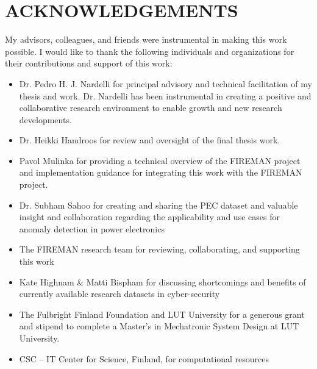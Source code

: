 \section*{\MakeUppercase{Acknowledgements}}
\thispagestyle{empty}
{}%

My advisors, colleagues, and friends were instrumental in making this work possible. I would like to thank the following individuals and organizations for their contributions and support of this work:

\begin{itemize}
    \item Dr. Pedro H. J. Nardelli for principal advisory and technical facilitation of my thesis and work. Dr. Nardelli has been instrumental in creating a positive and collaborative research environment to enable growth and new research developments.
    \item Dr. Heikki Handroos for review and oversight of the final thesis work.
    \item Pavol Mulinka for providing a technical overview of the FIREMAN project and implementation guidance for integrating this work with the FIREMAN project.
    \item Dr. Subham Sahoo for creating and sharing the PEC dataset and valuable insight and collaboration regarding the applicability and use cases for anomaly detection in power electronics
    \item The FIREMAN research team for reviewing, collaborating, and supporting this work
    \item Kate Highnam \& Matti Bispham for discussing shortcomings and benefits of currently available research datasets in cyber-security
    \item The Fulbright Finland Foundation and LUT University for a generous grant and stipend to complete a Master's in Mechatronic System Design at LUT University. 
	\item CSC – IT Center for Science, Finland, for computational resources
\end{itemize}
